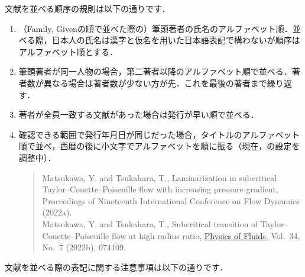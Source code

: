 文献を並べる順序の規則は以下の通りです．
\begin{tcolorbox}[enhanced, title=\textgt{文献ソート規則}, drop fuzzy shadow]
    \begin{enumerate}
        \item （Family, Givenの順で並べた際の）筆頭著者の氏名のアルファベット順．並べる際，日本人の氏名は漢字と仮名を用いた日本語表記で構わないが順序はアルファベット順とする．
        \item 筆頭著者が同一人物の場合，第二著者以降のアルファベット順で並べる．著者数が異なる場合は著者数が少ない方が先．これを最後の著者まで繰り返す．
        \item 著者が全員一致する文献があった場合は発行が早い順で並べる．
        \item 確認できる範囲で発行年月日が同じだった場合，タイトルのアルファベット順で並べ，西暦の後に小文字でアルファベットを順に振る（現在，\jsmefile の設定を調整中）．
        \begin{quote}
            Matsukawa, Y. and Tsukahara, T., Laminarization in subcritical Taylor--Couette--Poiseuille flow with increasing pressure gradient, Proceedings of Nineteenth International Conference on Flow Dynamics (2022a). \\
            Matsukawa, Y. and Tsukahara, T., Subcritical transition of Taylor--Couette--Poiseuille flow at high radius ratio, \href{https://doi.org/10.1063/5.0096676}{Physics of Fluids}, Vol.~34, No.~7 (2022b), 074109.
        \end{quote}
    \end{enumerate}
\end{tcolorbox}
\noindent
文献を並べる際の表記に関する注意事項は以下の通りです．
\renewcommand\UrlFont{\rmfamily}
